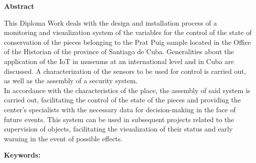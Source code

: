 \setcounter{page}{5}
\thispagestyle{empty}

    \textbf{\Large Abstract}
    \newline

This Diploma Work deals with the design and installation process of a monitoring and visualization system of the variables for the control of the state of conservation of the pieces belonging to the Prat Puig sample located in the Office of the Historian of the province of Santiago de Cuba. Generalities about the application of the IoT in museums at an international level and in Cuba are discussed. A characterization of the sensors to be used for control is carried out, as well as the assembly of a security system.\\
In accordance with the characteristics of the place, the assembly of said system is carried out, facilitating the control of the state of the pieces and providing the center's specialists with the necessary data for decision-making in the face of future events. This system can be used in subsequent projects related to the supervision of objects, facilitating the visualization of their status and early warning in the event of possible effects.

\vfill

\begin{flushleft}
    \textbf{Keywords: }
\end{flushleft}